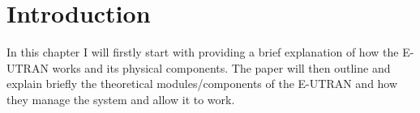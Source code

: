 \section{Introduction}{
	In this chapter I will firstly start with providing a brief explanation of how the E-UTRAN works and its physical components. The paper will then outline and explain briefly the theoretical modules/components of the E-UTRAN and how they manage the system and allow it to work.
}